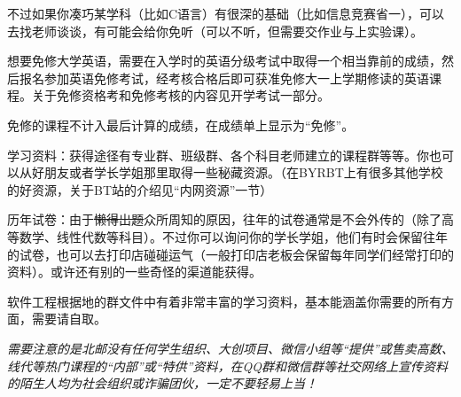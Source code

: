 不过如果你凑巧某学科（比如C语言）有很深的基础（比如信息竞赛省一），可以去找老师谈谈，有可能会给你免听（可以不听，但需要交作业与上实验课）。

想要免修大学英语，需要在入学时的英语分级考试中取得一个相当靠前的成绩，然后报名参加英语免修考试，经考核合格后即可获准免修大一上学期修读的英语课程。关于免修资格考和免修考核的内容见开学考试一部分。

免修的课程不计入最后计算的成绩，在成绩单上显示为“免修”。


学习资料：获得途径有专业群、班级群、各个科目老师建立的课程群等等。你也可以从好朋友或者学长学姐那里取得一些秘藏资源。（在BYRBT上有很多其他学校的好资源，关于BT站的介绍见“内网资源”一节）

历年试卷：由于\sout{懒得出题}众所周知的原因，往年的试卷通常是不会外传的（除了高等数学、线性代数等科目）。不过你可以询问你的学长学姐，他们有时会保留往年的试卷，也可以去打印店碰碰运气（一般打印店老板会保留每年同学们经常打印的资料）。或许还有别的一些奇怪的渠道能获得。

软件工程根据地的群文件中有着非常丰富的学习资料，基本能涵盖你需要的所有方面，需要请自取。

\emph{需要注意的是北邮没有任何学生组织、大创项目、微信小组等“提供”或售卖高数、线代等热门课程的“内部”或“特供”资料，在QQ群和微信群等社交网络上宣传资料的陌生人均为社会组织或诈骗团伙，一定不要轻易上当！}
